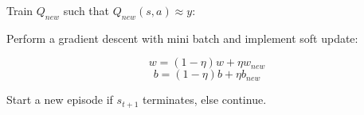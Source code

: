 \documentclass{article}
\begin{document}
\noindent \hspace{1cm} Train \(Q_{new}\) such that \(Q_{new}(s, a) \approx y\):

\noindent \hspace{1cm} Perform a gradient descent with mini batch and implement soft update:

\[w = (1 - \eta)w + \eta w_{new}\]
\[b = (1 - \eta)b + \eta b_{new}\]

\bigskip

\noindent \hspace{1cm} Start a new episode if \(s_{t+1}\) terminates, else continue.

\printindex
\end{document}
